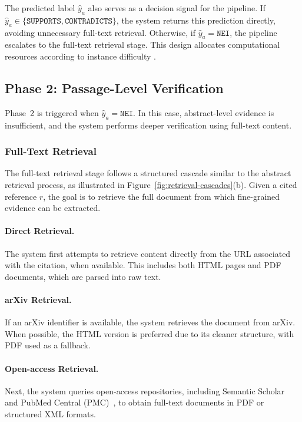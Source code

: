 \documentclass{article}
\theoremstyle{plain}
\theoremstyle{definition}
\theoremstyle{remark}
\begin{document}
The predicted label $\hat{y}_a$ also serves as a decision signal for the pipeline. If $\hat{y}_a \in \{\texttt{SUPPORTS}, \texttt{CONTRADICTS}\}$, the system returns this prediction directly, avoiding unnecessary full-text retrieval. Otherwise, if $\hat{y}_a = \texttt{NEI}$, the pipeline escalates to the full-text retrieval stage. This design allocates computational resources according to instance difficulty \cite{wadden2022scifact}.



\subsection{Phase 2: Passage-Level Verification}
\label{sec:phase2}

Phase~2 is triggered when $\hat{y}_a = \texttt{NEI}$. In this case, abstract-level evidence is insufficient, and the system performs deeper verification using full-text content.

\subsubsection{Full-Text Retrieval}
\label{sec:fulltext_retrieval}

The full-text retrieval stage follows a structured cascade similar to the abstract retrieval process, as illustrated in Figure~\ref{fig:retrieval-cascades}(b). Given a cited reference $r$, the goal is to retrieve the full document from which fine-grained evidence can be extracted.

\paragraph{Direct Retrieval.}
The system first attempts to retrieve content directly from the URL associated with the citation, when available. This includes both HTML pages and PDF documents, which are parsed into raw text.

\paragraph{arXiv Retrieval.}
If an arXiv identifier is available, the system retrieves the document from arXiv. When possible, the HTML version is preferred due to its cleaner structure, with PDF used as a fallback.

\paragraph{Open-access Retrieval.}
Next, the system queries open-access repositories, including Semantic Scholar~\cite{kinney2023semantic} and PubMed Central (PMC)~\cite{sayers2022pubmed}, to obtain full-text documents in PDF or structured XML formats.
\end{document}
